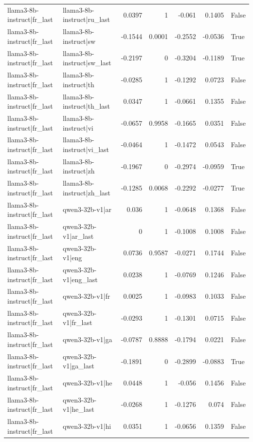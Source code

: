 \begin{table}
\begin{tabular}{l l r r r r l}
llama3-8b-instruct|fr_last & llama3-8b-instruct|ru_last & 0.0397 & 1 & -0.061 & 0.1405 & False \\
llama3-8b-instruct|fr_last & llama3-8b-instruct|sw & -0.1544 & 0.0001 & -0.2552 & -0.0536 & True \\
llama3-8b-instruct|fr_last & llama3-8b-instruct|sw_last & -0.2197 & 0 & -0.3204 & -0.1189 & True \\
llama3-8b-instruct|fr_last & llama3-8b-instruct|th & -0.0285 & 1 & -0.1292 & 0.0723 & False \\
llama3-8b-instruct|fr_last & llama3-8b-instruct|th_last & 0.0347 & 1 & -0.0661 & 0.1355 & False \\
llama3-8b-instruct|fr_last & llama3-8b-instruct|vi & -0.0657 & 0.9958 & -0.1665 & 0.0351 & False \\
llama3-8b-instruct|fr_last & llama3-8b-instruct|vi_last & -0.0464 & 1 & -0.1472 & 0.0543 & False \\
llama3-8b-instruct|fr_last & llama3-8b-instruct|zh & -0.1967 & 0 & -0.2974 & -0.0959 & True \\
llama3-8b-instruct|fr_last & llama3-8b-instruct|zh_last & -0.1285 & 0.0068 & -0.2292 & -0.0277 & True \\
llama3-8b-instruct|fr_last & qwen3-32b-v1|ar & 0.036 & 1 & -0.0648 & 0.1368 & False \\
llama3-8b-instruct|fr_last & qwen3-32b-v1|ar_last & 0 & 1 & -0.1008 & 0.1008 & False \\
llama3-8b-instruct|fr_last & qwen3-32b-v1|eng & 0.0736 & 0.9587 & -0.0271 & 0.1744 & False \\
llama3-8b-instruct|fr_last & qwen3-32b-v1|eng_last & 0.0238 & 1 & -0.0769 & 0.1246 & False \\
llama3-8b-instruct|fr_last & qwen3-32b-v1|fr & 0.0025 & 1 & -0.0983 & 0.1033 & False \\
llama3-8b-instruct|fr_last & qwen3-32b-v1|fr_last & -0.0293 & 1 & -0.1301 & 0.0715 & False \\
llama3-8b-instruct|fr_last & qwen3-32b-v1|ga & -0.0787 & 0.8888 & -0.1794 & 0.0221 & False \\
llama3-8b-instruct|fr_last & qwen3-32b-v1|ga_last & -0.1891 & 0 & -0.2899 & -0.0883 & True \\
llama3-8b-instruct|fr_last & qwen3-32b-v1|he & 0.0448 & 1 & -0.056 & 0.1456 & False \\
llama3-8b-instruct|fr_last & qwen3-32b-v1|he_last & -0.0268 & 1 & -0.1276 & 0.074 & False \\
llama3-8b-instruct|fr_last & qwen3-32b-v1|hi & 0.0351 & 1 & -0.0656 & 0.1359 & False \\

\end{tabular}
\end{table}
